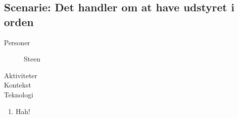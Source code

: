 \subsection{Scenarie: Det handler om at have udstyret i orden}
\begin{description}
    \item[Personer] Steen
    \item[Aktiviteter]
    \item[Kontekst]
    \item[Teknologi]
\end{description}

\begin{enumerate}
    \item Hah!
\end{enumerate}
